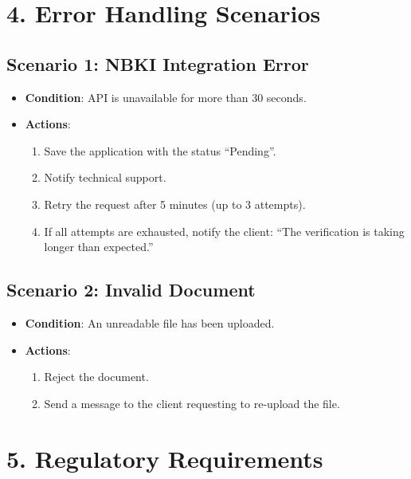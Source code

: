 \documentclass[a4paper,12pt]{article}
\begin{document}
\section*{4. Error Handling Scenarios}

\subsection*{Scenario 1: NBKI Integration Error}
\begin{itemize}
    \item \textbf{Condition}: API is unavailable for more than 30 seconds.
    \item \textbf{Actions}:
    \begin{enumerate}
        \item Save the application with the status “Pending”.
        \item Notify technical support.
        \item Retry the request after 5 minutes (up to 3 attempts).
        \item If all attempts are exhausted, notify the client: “The verification is taking longer than expected.”
    \end{enumerate}
\end{itemize}

\subsection*{Scenario 2: Invalid Document}
\begin{itemize}
    \item \textbf{Condition}: An unreadable file has been uploaded.
    \item \textbf{Actions}:
    \begin{enumerate}
        \item Reject the document.
        \item Send a message to the client requesting to re-upload the file.
    \end{enumerate}
\end{itemize}

\section*{5. Regulatory Requirements}
\end{document}
